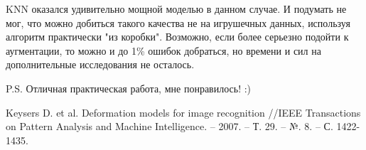 \documentclass[12pt,fleqn]{article}
\begin{document}
KNN оказался удивительно мощной моделью в данном случае. И подумать не мог, что 
можно добиться такого качества не на игрушечных данных, используя алгоритм практически "из коробки". 
Возможно, если более серьезно подойти к аугментации, то можно и до 1\% ошибок добраться, 
но времени и сил на дополнительные исследования не осталось.

P.S. Отличная практическая работа, мне понравилось! :)
 
\begin{thebibliography}{99}
    Keysers D. et al. Deformation models for image recognition
    //IEEE Transactions on Pattern Analysis and Machine Intelligence.
     – 2007. – Т. 29. – №. 8. – С. 1422-1435.
\end{thebibliography}
\end{document}
